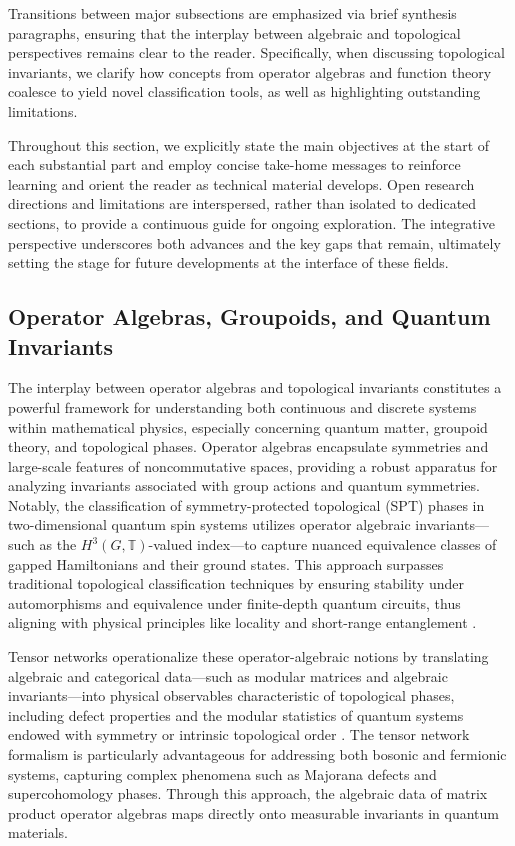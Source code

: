 \documentclass[sigconf]{acmart}
\begin{document}
Transitions between major subsections are emphasized via brief synthesis paragraphs, ensuring that the interplay between algebraic and topological perspectives remains clear to the reader. Specifically, when discussing topological invariants, we clarify how concepts from operator algebras and function theory coalesce to yield novel classification tools, as well as highlighting outstanding limitations.

Throughout this section, we explicitly state the main objectives at the start of each substantial part and employ concise take-home messages to reinforce learning and orient the reader as technical material develops. Open research directions and limitations are interspersed, rather than isolated to dedicated sections, to provide a continuous guide for ongoing exploration. The integrative perspective underscores both advances and the key gaps that remain, ultimately setting the stage for future developments at the interface of these fields.

\subsection{Operator Algebras, Groupoids, and Quantum Invariants}

The interplay between operator algebras and topological invariants constitutes a powerful framework for understanding both continuous and discrete systems within mathematical physics, especially concerning quantum matter, groupoid theory, and topological phases. Operator algebras encapsulate symmetries and large-scale features of noncommutative spaces, providing a robust apparatus for analyzing invariants associated with group actions and quantum symmetries. Notably, the classification of symmetry-protected topological (SPT) phases in two-dimensional quantum spin systems utilizes operator algebraic invariants—such as the $H^3(G, \mathbb{T})$-valued index—to capture nuanced equivalence classes of gapped Hamiltonians and their ground states. This approach surpasses traditional topological classification techniques by ensuring stability under automorphisms and equivalence under finite-depth quantum circuits, thus aligning with physical principles like locality and short-range entanglement \cite{ref18}.

Tensor networks operationalize these operator-algebraic notions by translating algebraic and categorical data—such as modular matrices and algebraic invariants—into physical observables characteristic of topological phases, including defect properties and the modular statistics of quantum systems endowed with symmetry or intrinsic topological order \cite{ref21}. The tensor network formalism is particularly advantageous for addressing both bosonic and fermionic systems, capturing complex phenomena such as Majorana defects and supercohomology phases. Through this approach, the algebraic data of matrix product operator algebras maps directly onto measurable invariants in quantum materials.
\end{document}
